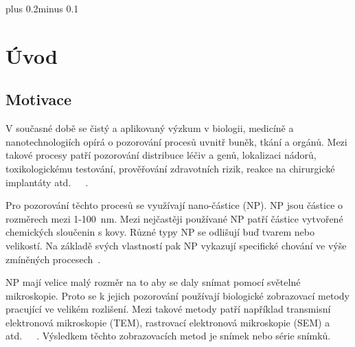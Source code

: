 \documentclass[11pt,twoside,a4paper,table]{book}
\begin{document}
\tableofcontents

\listoffigures

\listoftables


\mainbodystarts
\fontsize{11pt}{15pt}\selectfont
{}\baselineskip plus 0.2\baselineskip minus 0.1\baselineskip



\chapter*{Úvod}

\section{Motivace}
V současné době se čistý a aplikovaný výzkum v biologii, medicíně a nanotechnologiích opírá o pozorování procesů uvnitř buněk, tkání a orgánů. Mezi takové procesy patří pozorování distribuce léčiv a genů, lokalizaci nádorů, toxikologickému testování, prověřování zdravotních rizik, reakce na chirurgické implantáty atd.~\cite{np:ostrowski}~\cite{np:mayhew}~\cite{np:coloc}.

Pro pozorování těchto procesů se využívají nano-částice (NP). NP jsou částice o rozměrech mezi 1-100~nm. Mezi nejčastěji používané NP patří částice vytvořené chemických sloučenin s kovy. Různé typy NP se odlišují buď tvarem nebo velikostí. Na základě svých vlastností pak NP vykazují specifické chování ve výše zmíněných procesech~\cite{np:intro}.

NP mají velice malý rozměr na to aby se daly snímat pomocí světelné mikroskopie. Proto se k jejich pozorování používají biologické zobrazovací metody pracující ve velikém rozlišení. Mezi takové metody patří například transmisní elektronová mikroskopie (TEM), rastrovací elektronová mikroskopie (SEM) a atd.~\cite{np:ostrowski}~\cite{np:mayhew}~\cite{np:coloc}. Výsledkem těchto zobrazovacích metod je snímek nebo série snímků.
\end{document}
